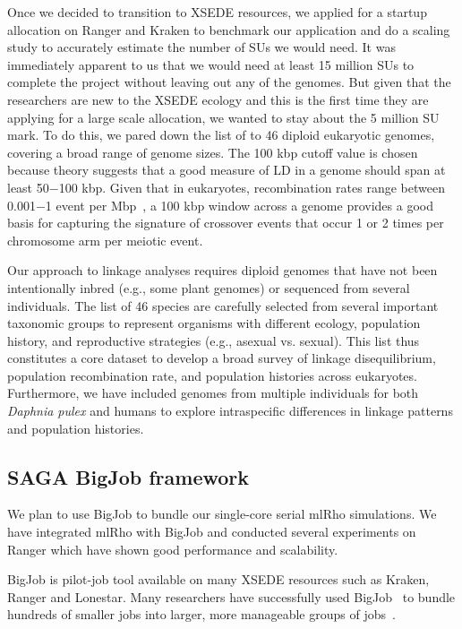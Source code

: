 \documentclass{sig-alternate}
\newcommand{\abhi}[1]{ {\textcolor{red} { ***Abhinav: #1 }}}
\newcommand{\abhi}[1]{ {}}
\begin{document}

Once we decided to transition to XSEDE resources, we applied for a startup allocation on Ranger and Kraken to benchmark our application and do a scaling study to accurately estimate the number of SUs we would need. It was immediately apparent to us that we would need at least 15 million SUs to complete the project without leaving out any of the genomes. But given that the researchers are new to the XSEDE ecology and this is the first time they are applying for a large scale allocation, we wanted to stay about the 5 million SU mark. To do this, we pared down the list of to 46 diploid eukaryotic genomes, covering a broad range of genome sizes.
The 100 kbp cutoff value is chosen because theory suggests that a good measure
of LD in a genome should span at least 50$-$100 kbp. Given that in eukaryotes, recombination rates range
between 0.001$-$1 event per Mbp~\cite{annurev-genom-082410-101412}, a 100 kbp window across a genome provides
a good basis for capturing the signature of crossover events that occur 1 or 2 times per chromosome arm per
meiotic event.

Our approach to linkage analyses requires diploid genomes that have not been intentionally inbred  (e.g., some plant genomes) or sequenced from several individuals. The list of 46 species are carefully selected from several important taxonomic groups to represent organisms with different ecology, population history, and reproductive strategies  (e.g., asexual vs. sexual). This list  thus constitutes a core dataset to develop a broad survey of linkage disequilibrium, population recombination rate, and population histories across eukaryotes. Furthermore, we have included genomes from multiple individuals for both {\it Daphnia pulex} and humans to explore intraspecific differences in linkage patterns and population histories. 

\subsection{SAGA BigJob framework}
\label{sec:bigjob}

We plan to use BigJob to bundle our single-core serial mlRho simulations. We have integrated mlRho with BigJob and conducted several experiments on Ranger which have shown good performance and scalability. 

BigJob is pilot-job tool available on many XSEDE resources such as Kraken, Ranger and Lonestar. Many researchers have successfully used BigJob~\cite{bigjob_web} to bundle hundreds of smaller jobs into larger, more manageable groups of jobs~\cite{Luckow:2008fp, async_repex11}. 
\end{document}
